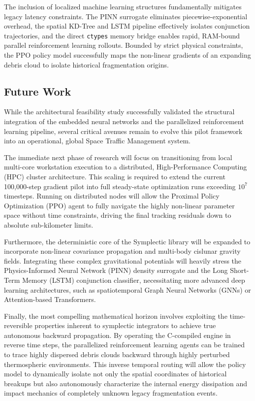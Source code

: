 \documentclass[letterpaper, preprint, 11pt]{AAS}
\begin{document}
The inclusion of localized machine learning structures fundamentally mitigates legacy latency constraints. The PINN surrogate eliminates piecewise-exponential overhead, the spatial KD-Tree and LSTM pipeline effectively isolates conjunction trajectories, and the direct \texttt{ctypes} memory bridge enables rapid, RAM-bound parallel reinforcement learning rollouts. Bounded by strict physical constraints, the PPO policy model successfully maps the non-linear gradients of an expanding debris cloud to isolate historical fragmentation origins.

\subsection{Future Work}
While the architectural feasibility study successfully validated the structural integration of the embedded neural networks and the parallelized reinforcement learning pipeline, several critical avenues remain to evolve this pilot framework into an operational, global Space Traffic Management system. 

The immediate next phase of research will focus on transitioning from local multi-core workstation execution to a distributed, High-Performance Computing (HPC) cluster architecture. This scaling is required to extend the current 100,000-step gradient pilot into full steady-state optimization runs exceeding $10^7$ timesteps. Running on distributed nodes will allow the Proximal Policy Optimization (PPO) agent to fully navigate the highly non-linear parameter space without time constraints, driving the final tracking residuals down to absolute sub-kilometer limits.

Furthermore, the deterministic core of the Symplectic library will be expanded to incorporate non-linear covariance propagation and multi-body cislunar gravity fields. Integrating these complex gravitational potentials will heavily stress the Physics-Informed Neural Network (PINN) density surrogate and the Long Short-Term Memory (LSTM) conjunction classifier, necessitating more advanced deep learning architectures, such as spatiotemporal Graph Neural Networks (GNNs) or Attention-based Transformers.

Finally, the most compelling mathematical horizon involves exploiting the time-reversible properties inherent to symplectic integrators to achieve true autonomous backward propagation. By operating the C-compiled engine in reverse time steps, the parallelized reinforcement learning agents can be trained to trace highly dispersed debris clouds backward through highly perturbed thermospheric environments. This inverse temporal routing will allow the policy model to dynamically isolate not only the spatial coordinates of historical breakups but also autonomously characterize the internal energy dissipation and impact mechanics of completely unknown legacy fragmentation events.



\end{document}
